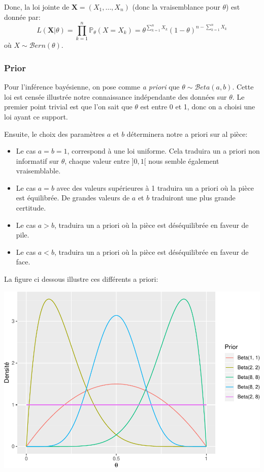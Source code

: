 \documentclass[]{article}
\providecommand{\tightlist}{%
  \setlength{\itemsep}{0pt}\setlength{\parskip}{0pt}}
\begin{document}
Donc, la loi jointe de \(\mathbf{X} = (X_1,\dots,X_{n})\) (donc la
vraisemblance pour \(\theta\)) est donnée par:
\[L(\mathbf{X}\vert \theta) = \prod_{k = 1}^{n}\mathbb{P}_\theta(X = X_k) = \theta^{\sum_{k=1}^n X_k}\left(1 - \theta \right)^{n - \sum_{k=1}^n X_k}\]
où \(X \sim \mathcal{B}ern(\theta)\).

\hypertarget{prior}{%
\subsubsection{Prior}\label{prior}}

Pour l'inférence bayésienne, on pose comme \emph{a priori} que
\(\theta \sim \mathcal{B}eta(a, b)\). Cette loi est censée illustrée
notre connaissance indépendante des données sur \(\theta\). Le premier
point trivial est que l'on sait que \(\theta\) est entre 0 et 1, donc on
a choisi une loi ayant ce support.

Ensuite, le choix des paramètres \(a\) et \(b\) déterminera notre a
priori sur al pièce:

\begin{itemize}
\tightlist
\item
  Le cas \(a = b = 1\), correspond à une loi uniforme. Cela traduira un
  a priori non informatif sur \(\theta\), chaque valeur entre \(]0,1[\)
  nous semble également vraisemblable.
\item
  Le cas \(a = b\) avec des valeurs supérieures à 1 traduira un a priori
  où la pièce est équilibrée. De grandes valeurs de \(a\) et \(b\)
  traduiront une plus grande certitude.
\item
  Le cas \(a > b\), traduira un a priori où la pièce est déséquilibrée
  en faveur de pile.
\item
  Le cas \(a < b\), traduira un a priori où la pièce est déséquilibrée
  en faveur de face.
\end{itemize}

La figure ci dessous illustre ces différents a priori:

\includegraphics{chapitre_inference_bayesienne_files/figure-latex/df_prior-1.pdf}
\end{document}
